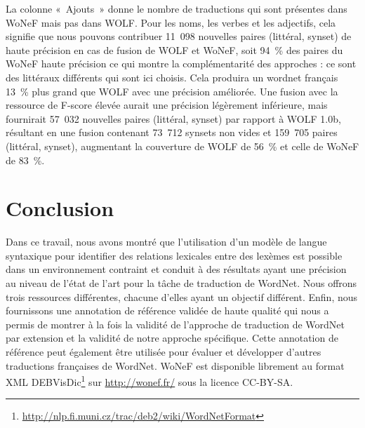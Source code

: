 La colonne «~Ajouts~» donne le nombre de traductions qui sont présentes dans
WoNeF mais pas dans WOLF. Pour les noms, les verbes et les adjectifs, cela
signifie que nous pouvons contribuer 11~098 nouvelles paires (littéral, synset)
de haute précision en cas de fusion de WOLF et WoNeF, soit 94~\% des paires du
WoNeF haute précision ce qui montre la complémentarité des approches : ce sont
des littéraux différents qui sont ici choisis. Cela produira un wordnet
français 13~\% plus grand que WOLF avec une précision améliorée. Une fusion
avec la ressource de F-score élevée aurait une précision légèrement inférieure,
mais fournirait 57~032 nouvelles paires (littéral, synset) par rapport à WOLF
1.0b, résultant en une fusion contenant 73~712 synsets non vides et 159~705
paires (littéral, synset), augmentant la couverture de WOLF de 56~\% et celle
de WoNeF de 83~\%.


\section*{Conclusion}

Dans ce travail, nous avons montré que l'utilisation d'un modèle de langue
syntaxique pour identifier des relations lexicales entre des lexèmes est
possible dans un environnement contraint et conduit à des résultats ayant une
précision au niveau de l'état de l'art pour la tâche de traduction de WordNet.
Nous offrons trois ressources différentes, chacune d'elles ayant un objectif
différent. Enfin, nous fournissons une annotation de référence validée de haute
qualité qui nous a permis de montrer à la fois la validité de l'approche de
traduction de WordNet par extension et la validité de notre approche
spécifique. Cette annotation de référence peut également être utilisée pour
évaluer et développer d'autres traductions françaises de WordNet. WoNeF est
disponible librement au format XML
DEBVisDic\footnote{\url{http://nlp.fi.muni.cz/trac/deb2/wiki/WordNetFormat}}
sur \url{http://wonef.fr/} sous la licence CC-BY-SA.

